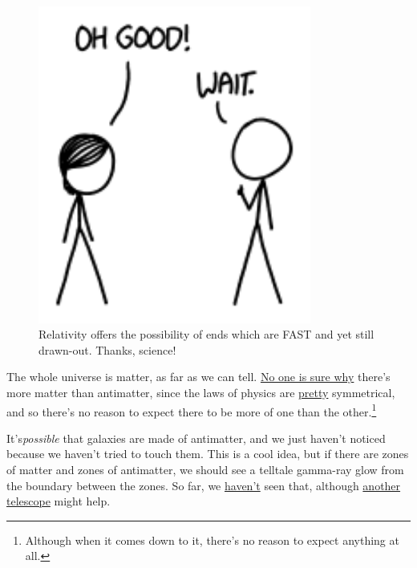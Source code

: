 {\begin{figure}[!htbp]
\centering
\includegraphics[scale=0.5, max width=0.8\textwidth]{imgs/a/114/good.png}
\caption{Relativity offers the possibility of ends which are FAST and yet still drawn-out. Thanks, science!}
\end{figure}

{The whole universe is matter, as far as we can tell. \href{http://en.wikipedia.org/wiki/Baryon\_asymmetry}{No one is sure why} there's more matter than antimatter, since the laws of physics are \href{http://en.wikipedia.org/wiki/CP\_violation\#CP-symmetry}{pretty} symmetrical, and so there's no reason to expect there to be more of one than the other.{\footnote{Although when it comes down to it, there's no reason to expect anything at all.} } }

{It's\emph{possible} that galaxies are made of antimatter, and we just haven't noticed because we haven't tried to touch them. This is a cool idea, but if there are zones of matter and zones of antimatter, we should see a telltale gamma-ray glow from the boundary between the zones. So far, we \href{http://www.researchgate.net/publication/1746009\_When\_Clusters\_Collide\_Constraints\_On\_Antimatter\_On\_The\_Largest\_Scales}{haven't} seen that, although \href{http://arxiv.org/abs/1401.7258}{another telescope} might help.}

}
